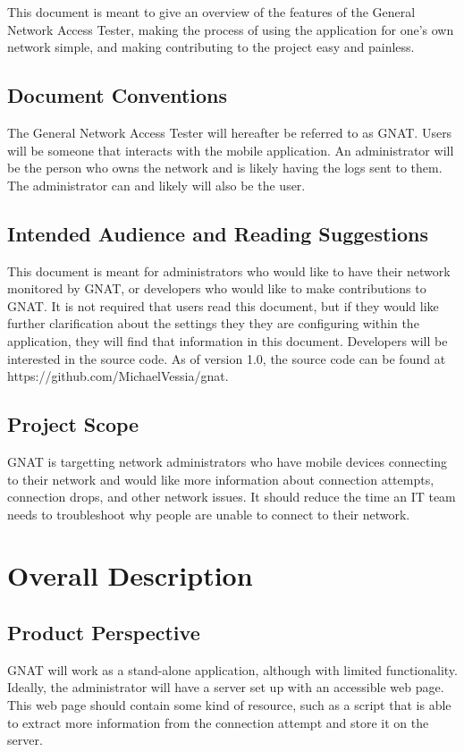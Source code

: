 \documentclass{scrreprt}
\def\version{1.0}
\def\sourcecode{https://github.com/MichaelVessia/gnat}
\begin{document}
This document is meant to give an overview of the features of the General Network Access Tester, making the process of using the application for one's own network simple, and making contributing to the project easy and painless.

\section{Document Conventions}
The General Network Access Tester will hereafter be referred to as GNAT\@. Users will be someone that interacts with the mobile application.  An administrator will be the person who owns the network and is likely having the logs sent to them.  The administrator can and likely will also be the user.

\section{Intended Audience and Reading Suggestions}
This document is meant for administrators who would like to have their network monitored by GNAT, or developers who would like to make contributions to GNAT\@. It is not required that users read this document, but if they would like further clarification about the settings they they are configuring within the application, they will find that information in this document.  Developers will be interested in the source code. As of version \version, the source code can be found at \sourcecode.

\section{Project Scope}

GNAT is targetting network administrators who have mobile devices connecting to their network and would like more information about connection attempts, connection drops, and other network issues. It should reduce the time an IT team needs to troubleshoot why people are unable to connect to their network.

\chapter{Overall Description}

\section{Product Perspective}

GNAT will work as a stand-alone application, although with limited functionality.  Ideally, the administrator will have a server set up with an accessible web page. This web page should contain some kind of resource, such as a script that is able to extract more information from the connection attempt and store it on the server.
\end{document}
